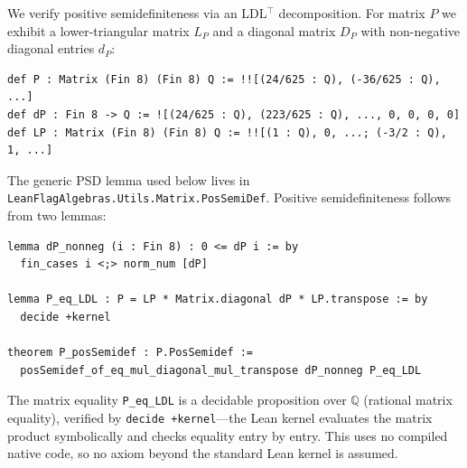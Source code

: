 \documentclass{article}
\newcommand{\Q}{\mathbb{Q}}
\newcommand{\lean}[1]{\texttt{#1}}
\begin{document}
We verify positive semidefiniteness via an LDL$^\top$ decomposition.  For
matrix $P$ we exhibit a lower-triangular matrix $L_P$ and a diagonal matrix
$D_P$ with non-negative diagonal entries $d_P$:
\begin{lstlisting}
def P : Matrix (Fin 8) (Fin 8) Q := !![(24/625 : Q), (-36/625 : Q), ...]
def dP : Fin 8 -> Q := ![(24/625 : Q), (223/625 : Q), ..., 0, 0, 0, 0]
def LP : Matrix (Fin 8) (Fin 8) Q := !![(1 : Q), 0, ...; (-3/2 : Q), 1, ...]
\end{lstlisting}
The generic PSD lemma used below lives in
\lean{LeanFlagAlgebras.Utils.Matrix.PosSemiDef}.  Positive semidefiniteness
follows from two lemmas:
\begin{lstlisting}
lemma dP_nonneg (i : Fin 8) : 0 <= dP i := by
  fin_cases i <;> norm_num [dP]

lemma P_eq_LDL : P = LP * Matrix.diagonal dP * LP.transpose := by
  decide +kernel

theorem P_posSemidef : P.PosSemidef :=
  posSemidef_of_eq_mul_diagonal_mul_transpose dP_nonneg P_eq_LDL
\end{lstlisting}
The matrix equality \lean{P\_eq\_LDL} is a decidable proposition over $\Q$
(rational matrix equality), verified by \lean{decide +kernel}---the Lean
kernel evaluates the matrix product symbolically and checks equality entry
by entry.  This uses no compiled native code, so no axiom beyond the standard
Lean kernel is assumed.
\end{document}
